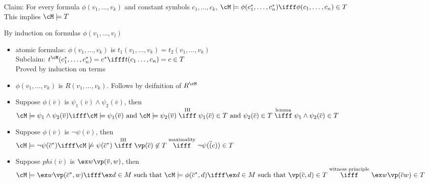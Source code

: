 \noindent
Claim: For every formula $\phi(v_1, \ldots, v_k)$ and constant symbols $c_1, \ldots, c_k$, $\cM \models \phi(c_1^*, \ldots, c_n^*) \ifff \phi(c_1, \ldots, c_n) \in T$ \\
This implies $\cM \models T$ 
\begin{pf}
    By induction on formulas $\phi(v_1, \ldots, v_l)$
    \begin{itemize}
        \item atomic formulas: $\phi(v_1, \ldots, v_k)$ is $t_1(v_1, \ldots, v_k)=t_2(v_1, \ldots, v_k)$ \\
        Subclaim: $t^{\cM}(c_1^*, \ldots, c_n^*) = c^* \ifff t(c_1 \ldots, c_n)=c \in T$ \\
        Proved by induction on terms 
        \item $\phi(v_1, \ldots, v_k)$ is $R(v_1, \ldots, v_k)$. Follows by deifnition of $R^{\cM}$
        \item Suppose $\phi(\overline{v})$ is $\psi_1 (\overline{v}) \wedge \psi_2(\overline{v})$, then \\
        $\cM \models \psi_1 \wedge \psi_2 (\overline{v}) \ifff \cM \models \psi_1(\overline{v}) \text{ and } \cM \models \psi_2(\overline{v}) \stackrel{\text{IH}}{\ifff}  \psi_1(\overline{c}) \in T \text{ and } \psi_2(\overline{c}) \in T \stackrel{\text{lemma}}{\ifff} \psi_1 \wedge \psi_2 (\overline{c}) \in T$
        \item Suppose $\phi(\overline{v})$ is $\neg \psi(\overline{v})$, then \\
        $\cM \models \neg \psi(\overline{c}^*) \ifff \cM \not\models \psi(\overline{c}^*) \stackrel{\text{IH}}{\ifff} \vp(\overline{c}) \not \in T \stackrel{\text{maximality}}{\ifff} \neg \psi(\overline(c)) \in T$
        \item Suppose $phi(\overline{v})$ is $\ex w \vp(\overline{v}, w)$, then \\
        $\cM \models \ex w \vp(\overline{c}^*, w) \ifff \ex d \in M \text{ such that } \cM \models \phi(\overline{c}^*, d) \ifff \ex d \in M \text{ such that } \vp(\overline{c}, d) \in T \stackrel{\text{witness principle}}{\ifff} \ex w \vp(\overline{c} w) \in T$
    \end{itemize}
\end{pf}